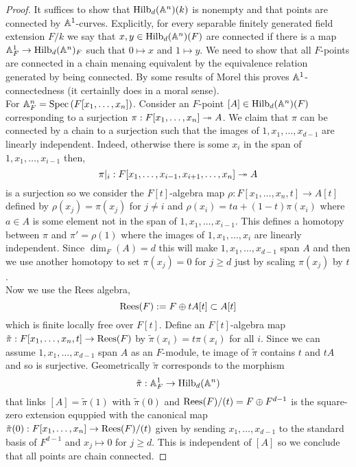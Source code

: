 \documentclass[12pt]{article}
\begin{document}
\begin{proof}
It suffices to show that $\mathrm{Hilb}_d(\mathbb{A}^n)(k)$ is nonempty and that points are connected by $\mathbb{A}^1$-curves. Explicitly, for every separable finitely generated field extension $F / k$ we say that $x, y \in \mathrm{Hilb}_d(\mathbb{A}^n)(F)$ are connected if there is a map $\mathbb{A}^1_F \to \mathrm{Hilb}_d(\mathbb{A}^n)_F$ such that $0 \mapsto x$ and $1 \mapsto y$. We need to show that all $F$-points are connected in a chain menaing equivalent by the equivalence relation generated by being connected. By some results of Morel this proves $\mathbb{A}^1$-connectedness (it certainlly does in a moral sense). 
\bigskip\\
For $\mathbb{A}^n_F = \mathrm{Spec}\left( F[x_1, \dots, x_n] \right)$. Consider an $F$-point $[A] \in \mathrm{Hilb}_d(\mathbb{A}^n)(F)$ corresponding to a surjection $\pi : F[x_1, \dots, x_n] \twoheadrightarrow A$. We claim that $\pi$ can be connected by a chain to a surjection such that the images of $1, x_1, \dots, x_{d-1}$ are linearly independent. Indeed, otherwise there is some $x_i$ in the span of $1, x_1, \dots, x_{i-1}$ then,
\[ \pi|_i : F[x_1, \dots, x_{i-1}, x_{i+1}, \dots, x_n] \twoheadrightarrow A \]
is a surjection so we consider the $F[t]$-algebra map $\rho : F[x_1, \dots, x_n, t] \to A[t]$ defined by $\rho(x_j) = \pi(x_j)$ for $j \neq i$ and $\rho(x_i) = t a + (1 - t) \pi(x_i)$ where $a \in A$ is some element not in the span of $1, x_1, \dots, x_{i-1}$. This defines a homotopy between $\pi$ and $\pi' = \rho(1)$ where the images of $1, x_1, \dots, x_{i}$ are linearly independent. Since $\dim_F(A) = d$ this will make $1, x_1, \dots, x_{d-1}$ span $A$ and then we use another homotopy to set $\pi(x_{j}) = 0$ for $j \ge d$ just by scaling $\pi(x_j)$ by $t$.
\bigskip\\
Now we use the Rees algebra,
\[ \mathrm{Rees}(F) := F \oplus t A[t] \subset A[t] \]
which is finite locally free over $F[t]$. Define an $F[t]$-algebra map $\tilde{\pi} : F[x_1, \dots, x_n, t] \to \mathrm{Rees}(F)$ by $\tilde{\pi}(x_i) = t \pi(x_i)$ for all $i$. Since we can assume $1, x_1, \dots, x_{d-1}$ span $A$ as an $F$-module, te image of $\tilde{\pi}$ contains $t$ and $t A$ and so is surjective. Geometrically $\tilde{\pi}$ corresponds to the morphism 
\[ \tilde{\pi} : \mathbb{A}^1_F \to \mathrm{Hilb}_d(\mathbb{A}^n) \]
that links $[A] = \tilde{\pi}(1)$ with $\tilde{\pi}(0)$ and $\mathrm{Rees}(F)/(t) = F \oplus F^{d-1}$ is the square-zero extension equppied with the canonical map $\tilde{\pi}(0) : F[x_1, \dots, x_n] \to \mathrm{Rees}(F)/(t)$ given by sending $x_1, \dots, x_{d-1}$ to the standard basis of $F^{d-1}$ and $x_j \mapsto 0$ for $j \ge d$. This is independent of $[A]$ so we conclude that all points are chain connected.
\end{proof}
\end{document}
